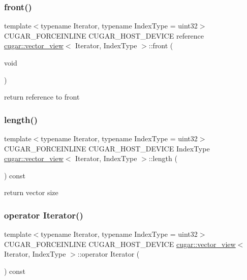 \subsubsection{\texorpdfstring{front()}{front()}\hspace{0.1cm}{\footnotesize\ttfamily [2/2]}}
{\footnotesize\ttfamily template$<$typename Iterator, typename Index\+Type = uint32$>$ \\
C\+U\+G\+A\+R\+\_\+\+F\+O\+R\+C\+E\+I\+N\+L\+I\+NE C\+U\+G\+A\+R\+\_\+\+H\+O\+S\+T\+\_\+\+D\+E\+V\+I\+CE reference \hyperlink{structcugar_1_1vector__view}{cugar\+::vector\+\_\+view}$<$ Iterator, Index\+Type $>$\+::front (\begin{DoxyParamCaption}\item[{void}]{ }\end{DoxyParamCaption})\hspace{0.3cm}{\ttfamily [inline]}}

return reference to front \mbox{\label{structcugar_1_1vector__view_a601703688bdebd25c563c95ecea1cf43}} 
\subsubsection{\texorpdfstring{length()}{length()}}
{\footnotesize\ttfamily template$<$typename Iterator, typename Index\+Type = uint32$>$ \\
C\+U\+G\+A\+R\+\_\+\+F\+O\+R\+C\+E\+I\+N\+L\+I\+NE C\+U\+G\+A\+R\+\_\+\+H\+O\+S\+T\+\_\+\+D\+E\+V\+I\+CE Index\+Type \hyperlink{structcugar_1_1vector__view}{cugar\+::vector\+\_\+view}$<$ Iterator, Index\+Type $>$\+::length (\begin{DoxyParamCaption}{ }\end{DoxyParamCaption}) const\hspace{0.3cm}{\ttfamily [inline]}}

return vector size \mbox{\label{structcugar_1_1vector__view_a75d37990f826ddc16faa41424d2db89c}} 
\subsubsection{\texorpdfstring{operator Iterator()}{operator Iterator()}}
{\footnotesize\ttfamily template$<$typename Iterator, typename Index\+Type = uint32$>$ \\
C\+U\+G\+A\+R\+\_\+\+F\+O\+R\+C\+E\+I\+N\+L\+I\+NE C\+U\+G\+A\+R\+\_\+\+H\+O\+S\+T\+\_\+\+D\+E\+V\+I\+CE \hyperlink{structcugar_1_1vector__view}{cugar\+::vector\+\_\+view}$<$ Iterator, Index\+Type $>$\+::operator Iterator (\begin{DoxyParamCaption}{ }\end{DoxyParamCaption}) const\hspace{0.3cm}{\ttfamily [inline]}}

